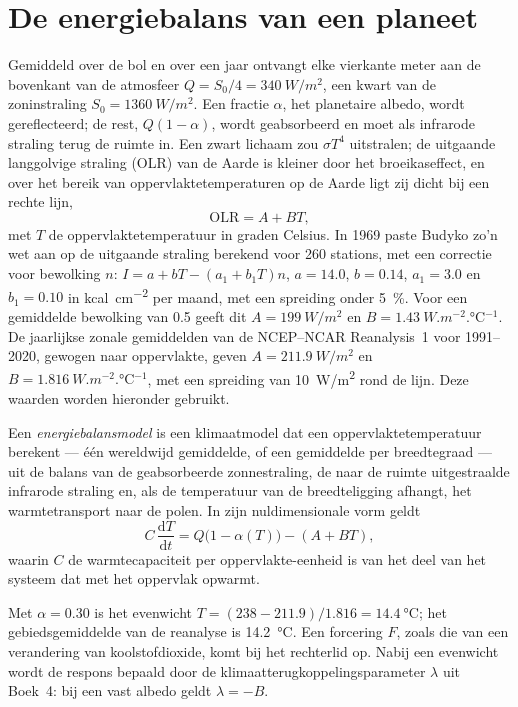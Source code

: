\section{De energiebalans van een planeet}\label{sec:b3:climate-models:zero-d}

Gemiddeld over de bol en over een jaar ontvangt elke vierkante meter aan de
bovenkant van de atmosfeer $Q = S_0/4 = \qty{340}{W/m^2}$, een kwart van de
zoninstraling $S_0 = \qty{1360}{W/m^2}$. Een fractie $\alpha$, het planetaire
albedo, wordt gereflecteerd; de rest, $Q(1 - \alpha)$, wordt geabsorbeerd en
moet als infrarode straling terug de ruimte in. Een zwart lichaam zou $\sigma
T^4$ uitstralen; de uitgaande langgolvige straling (OLR) van de Aarde is kleiner door
het broeikaseffect, en over het bereik van oppervlaktetemperaturen op de
Aarde ligt zij dicht bij een rechte lijn,
\[
\text{OLR} = A + BT ,
\]
met $T$ de oppervlaktetemperatuur in graden Celsius. In 1969 paste Budyko
zo'n wet aan op de uitgaande straling berekend voor 260 stations, met een correctie voor
bewolking $n$: $I = a + bT - (a_1 + b_1T)n$, $a = 14.0$, $b = 0.14$, $a_1 =
3.0$ en $b_1 = 0.10$ in \unit{kcal.cm^{-2}} per maand, met een spreiding onder
\qty{5}{\percent}. Voor een gemiddelde bewolking van 0.5 geeft dit $A =
\qty{199}{W/m^2}$ en $B = \qty{1.43}{W.m^{-2}.\celsius^{-1}}$. De jaarlijkse
zonale gemiddelden van de NCEP--NCAR Reanalysis~1 voor 1991--2020, gewogen naar
oppervlakte, geven $A = \qty{211.9}{W/m^2}$ en $B = \qty{1.816}{W.m^{-2}.\celsius^{-1}}$,
met een spreiding van \qty{10}{W/m^2} rond de lijn. Deze waarden worden
hieronder gebruikt.

\begin{definition}[Energiebalansmodel]\label{def:b3:climate-models:ebm}
Een \emph{energiebalansmodel} is een klimaatmodel dat
een oppervlaktetemperatuur berekent --- één wereldwijd gemiddelde, of een
gemiddelde per breedtegraad --- uit de balans van de geabsorbeerde zonnestraling, de
naar de ruimte uitgestraalde infrarode straling en, als de temperatuur van de breedteligging afhangt, het
warmtetransport naar de polen. In zijn nuldimensionale vorm geldt
\[
C\,\frac{\mathrm dT}{\mathrm dt} = Q\big(1 - \alpha(T)\big) - (A + BT) ,
\]
waarin $C$ de warmtecapaciteit per oppervlakte-eenheid is van het deel van het
systeem dat met het oppervlak opwarmt.
\end{definition}

Met $\alpha = 0.30$ is het evenwicht $T = (238 - 211.9)/1.816 =
\qty{14.4}{\celsius}$; het gebiedsgemiddelde van de reanalyse is
\qty{14.2}{\celsius}. Een forcering $F$, zoals die van een verandering van
koolstofdioxide, komt bij het rechterlid op. Nabij een evenwicht wordt de respons
bepaald door de klimaatterugkoppelingsparameter $\lambda$ uit Boek~4:
bij een vast albedo geldt $\lambda = -B$.

